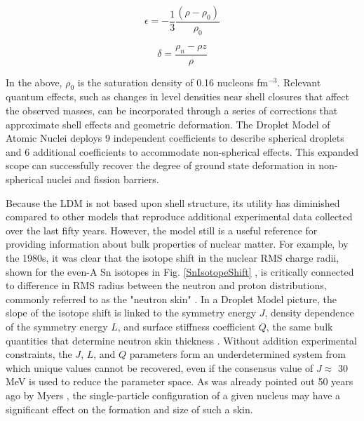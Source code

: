 \begin{equation}
    \epsilon = -\frac{1}{3}\frac{(\rho - \rho_{0})}{\rho_{0}}
\end{equation}

\begin{equation}
    \delta = \frac{\rho_{n}-\rho{z}}{\rho}
\end{equation}

\noindent
In the above, $\rho_{0}$ is the saturation density of 0.16 nucleons fm$^{-3}$. Relevant quantum
effects, such as changes in level densities near shell closures
that affect the observed masses, can be incorporated through a series of corrections
that approximate shell effects and geometric deformation.
The Droplet Model of Atomic Nuclei deploys 9 
independent coefficients to describe spherical droplets and 6 additional
coefficients to accommodate non-spherical effects. This expanded scope
can successfully recover the degree of ground state deformation in non-spherical
nuclei and fission barriers.

Because the LDM is not based upon shell structure, its utility has diminished
compared to other models that reproduce additional experimental data collected
over the last fifty years. However, the model still is a useful reference for providing 
information about bulk properties of nuclear matter. For example, by the 1980s,
it was clear that the isotope shift in the nuclear RMS
charge radii, shown for the even-A Sn isotopes in Fig.
\ref{SnIsotopeShift} \cite{Anselment1986, Otten1989},
is critically connected to difference in RMS radius 
between the neutron and proton distributions, commonly referred to as the
"neutron skin" \cite{Wilkinson1967}.
In a Droplet Model picture, the slope of the isotope shift is linked to the symmetry energy $J$, 
density dependence of the symmetry energy
$L$, and surface stiffness coefficient $Q$, the same bulk quantities that determine
neutron skin thickness \cite{Myers1969, MyersAndSwiatecki, Berdichevsky1988}.
Without addition experimental constraints, the $J$, $L$, and $Q$ parameters form an
underdetermined system from which unique values cannot be recovered, even if the
consensus value of $J \approx$ 30 MeV is used to reduce the parameter space.
As was already pointed out 50 years ago by Myers \cite{Myers1969},
the single-particle configuration of a given nucleus may have a significant
effect on the formation and size of such a skin.

